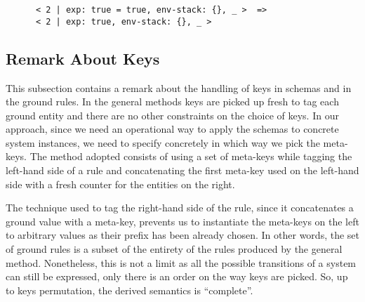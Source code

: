 \documentclass{article}[12pt,a4paper]
\theoremstyle{definition}
\begin{document}
\begin{Verbatim}
      < 2 | exp: true = true, env-stack: {}, _ >  =>
      < 2 | exp: true, env-stack: {}, _ >
\end{Verbatim}

\subsection{Remark About Keys}

This subsection contains a remark about the handling of keys in schemas and in
the ground rules. In the general methods keys are picked up fresh to tag each
ground entity and there are no other constraints on the choice of keys. In our
approach, since we need an operational way to apply the schemas to concrete
system instances, we need to
specify concretely in which way we pick the meta-keys. The method adopted
consists of using a set of meta-keys while tagging the left-hand side of a rule
and concatenating the first meta-key used on the left-hand side with a fresh
counter for the entities on the right.

The technique used to tag the right-hand side of the rule, since it concatenates
a ground value with a meta-key, prevents us to instantiate the meta-keys on the
left to arbitrary values as their prefix has been already chosen. In other
words, the set of ground rules is a subset of the entirety of the rules produced
by the general method. Nonetheless, this is not a limit as all the possible
transitions of a system can still be expressed, only there is an order on the way
keys are picked. So, up to keys permutation, the derived semantics is ``complete''.
\end{document}
